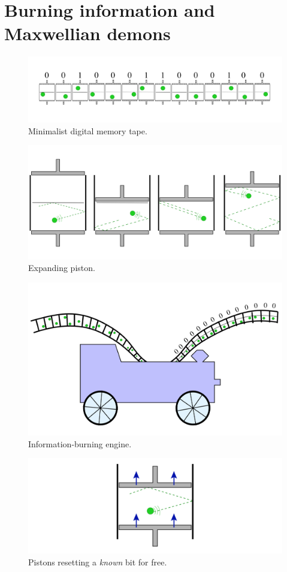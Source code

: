 \documentclass[11pt]{article}
\theoremstyle{definition}
\numberwithin{equation}{section}
\numberwithin{figure}{section}
\begin{document}
\newpage
\section{Burning information and Maxwellian demons}

\begin{figure}[p]
\centering
\includegraphics[width=0.4\linewidth]{Final_Fig1}
\caption{Minimalist digital memory tape.\label{fig:tape}}
\end{figure}

\begin{figure}[p]
\centering
\includegraphics[width=0.4\linewidth]{Final_Fig2}
\caption{Expanding piston.\label{fig:piston}}
\end{figure}

\begin{figure}[p]
\centering
\includegraphics[width=0.4\linewidth]{Final_Fig3}
\caption{Information-burning engine.\label{fig:engine}}
\end{figure}

\begin{figure}[p]
\centering
\includegraphics[width=0.4\linewidth]{Final_Fig4}
\caption{Pistons resetting a \textit{known} bit for free.\label{fig:zero}}
\end{figure}
\end{document}
